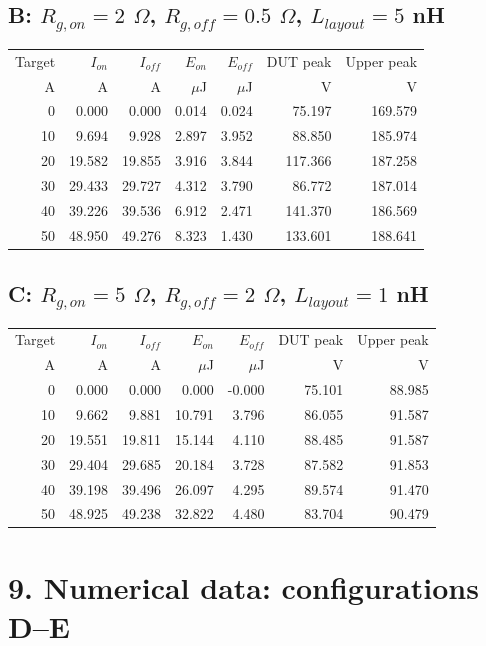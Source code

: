 \documentclass[10pt,a4paper]{article}
\begin{document}
\subsection*{B: $R_{g,on}=2$ $\Omega$, $R_{g,off}=0.5$ $\Omega$, $L_{layout}=5$ nH}
\begin{center}\small\begin{tabular}{rrrrrrr}\toprule Target & $I_{on}$ & $I_{off}$ & $E_{on}$ & $E_{off}$ & DUT peak & Upper peak\\ A & A & A & $\mu$J & $\mu$J & V & V\\\midrule
0 & 0.000 & 0.000 & 0.014 & 0.024 & 75.197 & 169.579\\
10 & 9.694 & 9.928 & 2.897 & 3.952 & 88.850 & 185.974\\
20 & 19.582 & 19.855 & 3.916 & 3.844 & 117.366 & 187.258\\
30 & 29.433 & 29.727 & 4.312 & 3.790 & 86.772 & 187.014\\
40 & 39.226 & 39.536 & 6.912 & 2.471 & 141.370 & 186.569\\
50 & 48.950 & 49.276 & 8.323 & 1.430 & 133.601 & 188.641\\
\bottomrule\end{tabular}\end{center}
\subsection*{C: $R_{g,on}=5$ $\Omega$, $R_{g,off}=2$ $\Omega$, $L_{layout}=1$ nH}
\begin{center}\small\begin{tabular}{rrrrrrr}\toprule Target & $I_{on}$ & $I_{off}$ & $E_{on}$ & $E_{off}$ & DUT peak & Upper peak\\ A & A & A & $\mu$J & $\mu$J & V & V\\\midrule
0 & 0.000 & 0.000 & 0.000 & -0.000 & 75.101 & 88.985\\
10 & 9.662 & 9.881 & 10.791 & 3.796 & 86.055 & 91.587\\
20 & 19.551 & 19.811 & 15.144 & 4.110 & 88.485 & 91.587\\
30 & 29.404 & 29.685 & 20.184 & 3.728 & 87.582 & 91.853\\
40 & 39.198 & 39.496 & 26.097 & 4.295 & 89.574 & 91.470\\
50 & 48.925 & 49.238 & 32.822 & 4.480 & 83.704 & 90.479\\
\bottomrule\end{tabular}\end{center}
\newpage\section*{9. Numerical data: configurations D--E}
\end{document}
